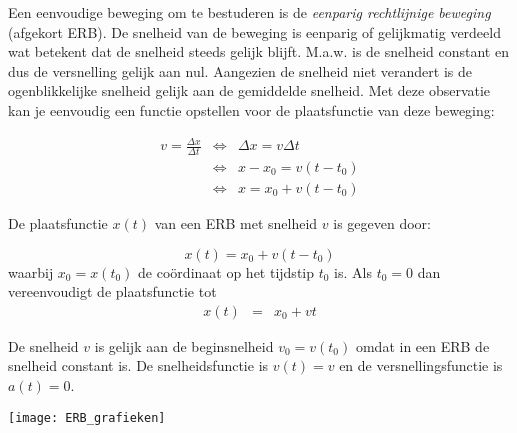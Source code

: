 \documentclass{ximera}
\begin{document}
	\author{Bart Lambregs}
    \xmsource\xmuitleg




Een eenvoudige beweging om te bestuderen is de \emph{eenparig rechtlijnige beweging} (afgekort ERB). De snelheid van de beweging is eenparig of gelijkmatig verdeeld wat betekent dat de snelheid steeds gelijk blijft. M.a.w. is de snelheid constant en dus de versnelling gelijk aan nul. Aangezien de snelheid niet verandert is de ogenblikkelijke snelheid gelijk aan de gemiddelde snelheid. Met deze observatie kan je eenvoudig een functie opstellen voor de plaatsfunctie van deze beweging:

\[
\begin{array}{rcl}

v=\frac{\Delta x}{\Delta t} & \Leftrightarrow & \Delta x=v\Delta t \\
&\Leftrightarrow & x-x_0=v(t-t_0) \\
&\Leftrightarrow & x=x_0+v(t-t_0)

\end{array}
\]

\begin{theorem}
De plaatsfunctie $x(t)$ van een ERB met snelheid $v$ is gegeven door:

\[
x(t)=x_0+v(t-t_0)
\]
waarbij $x_0=x(t_0)$ de coördinaat op het tijdstip $t_0$ is. Als $t_0=0$ dan vereenvoudigt de plaatsfunctie tot
\begin{eqnarray}%
x(t)&=&x_0+vt
\end{eqnarray}

\end{theorem}

De snelheid $v$ is gelijk aan de beginsnelheid $v_0=v(t_0)$ omdat in een ERB de snelheid constant is. De snelheidsfunctie is $v(t)=v$ en de versnellingsfunctie is $a(t)=0$.

\begin{image}
\texttt{[image: ERB\_grafieken]}
\end{image}
\end{document}
